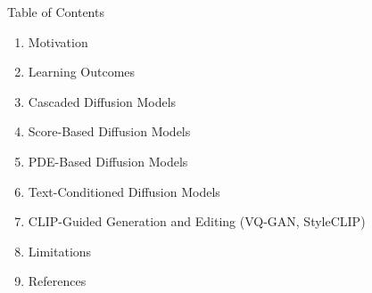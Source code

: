 \begin{frame}[allowframebreaks]{Table of Contents}
\begin{enumerate}
    \item Motivation
    \item Learning Outcomes
    \item Cascaded Diffusion Models
    \item Score-Based Diffusion Models
    \item PDE-Based Diffusion Models
    \item Text-Conditioned Diffusion Models
    \item CLIP-Guided Generation and Editing (VQ-GAN, StyleCLIP)
    \item Limitations
    \item References
\end{enumerate}
\end{frame}
